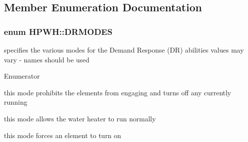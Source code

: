 \subsection{Member Enumeration Documentation}
\hypertarget{class_h_p_w_h_a6a74814715ed6a33a75fd0d9dc3e7107}{
\subsubsection[{D\-R\-M\-O\-D\-E\-S}]{\setlength{\rightskip}{0pt plus 5cm}enum {\bf H\-P\-W\-H\-::\-D\-R\-M\-O\-D\-E\-S}}}\label{class_h_p_w_h_a6a74814715ed6a33a75fd0d9dc3e7107}
specifies the various modes for the Demand Response (D\-R) abilities values may vary -\/ names should be used \begin{Desc}
\item[Enumerator]\par
\begin{description}
\item[{\em 
\hypertarget{class_h_p_w_h_a6a74814715ed6a33a75fd0d9dc3e7107acb6ede5bfedbd26d1e1021c1dfeaaea8}{D\-R\-\_\-\-B\-L\-O\-C\-K}\label{class_h_p_w_h_a6a74814715ed6a33a75fd0d9dc3e7107acb6ede5bfedbd26d1e1021c1dfeaaea8}
}]this mode prohibits the elements from engaging and turns off any currently running \item[{\em 
\hypertarget{class_h_p_w_h_a6a74814715ed6a33a75fd0d9dc3e7107a3ad0a53f7db054449c523c96107a820a}{D\-R\-\_\-\-A\-L\-L\-O\-W}\label{class_h_p_w_h_a6a74814715ed6a33a75fd0d9dc3e7107a3ad0a53f7db054449c523c96107a820a}
}]this mode allows the water heater to run normally \item[{\em 
\hypertarget{class_h_p_w_h_a6a74814715ed6a33a75fd0d9dc3e7107ac7a7e433da8920f98289ecd6b3246a6a}{D\-R\-\_\-\-E\-N\-G\-A\-G\-E}\label{class_h_p_w_h_a6a74814715ed6a33a75fd0d9dc3e7107ac7a7e433da8920f98289ecd6b3246a6a}
}]this mode forces an element to turn on \end{description}
\end{Desc}
